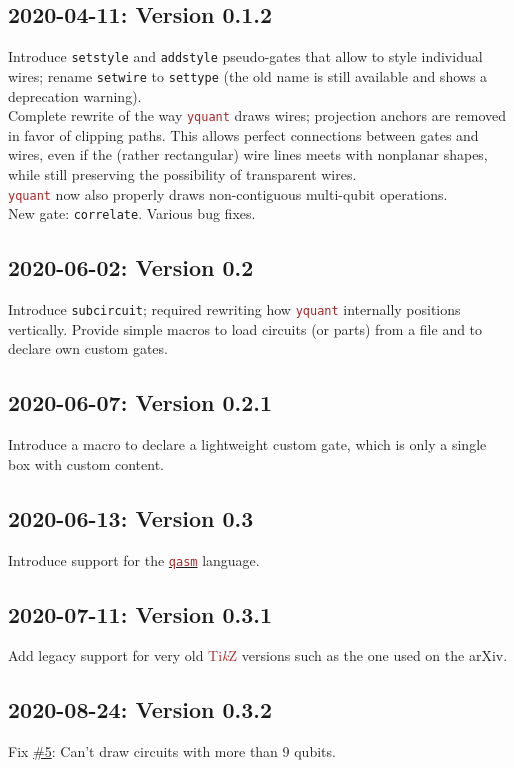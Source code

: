 \documentclass{scrartcl}
\def\TikZ{\textcolor{brown}{Ti\textit kZ}}
\def\pkg#1{\textcolor{brown}{\texttt{#1}}}
\def\langlink#1{\hyperref[sec:foreign:#1]{\pkg{#1}}}
\def\ttlink{\link\texttt}
\def\Yquant{\pkg{yquant}}
\begin{document}
      \subsection*{2020-04-11: Version 0.1.2}
         Introduce \ttlink{setstyle} and \ttlink{addstyle} pseudo\hyp gates that allow to style individual wires; rename \ttlink{setwire} to \ttlink{settype} (the old name is still available and shows a deprecation warning). \\
         Complete rewrite of the way \Yquant{} draws wires; projection anchors are removed in favor of clipping paths.
         This allows perfect connections between gates and wires, even if the (rather rectangular) wire lines meets with nonplanar shapes, while still preserving the possibility of transparent wires. \\
         \Yquant{} now also properly draws non\hyp contiguous multi\hyp qubit operations. \\
         New gate: \ttlink{correlate}.
         Various bug fixes.

      \subsection*{2020-06-02: Version 0.2}
         Introduce \ttlink{subcircuit}; required rewriting how \Yquant{} internally positions vertically.
         Provide simple macros to load circuits (or parts) from a file and to declare own custom gates.

      \subsection*{2020-06-07: Version 0.2.1}
         Introduce a macro to declare a lightweight custom gate, which is only a single box with custom content.

      \subsection*{2020-06-13: Version 0.3}
         Introduce support for the \langlink{qasm} language.

      \subsection*{2020-07-11: Version 0.3.1}
         Add legacy support for very old \TikZ{} versions such as the one used on the arXiv.

      \subsection*{2020-08-24: Version 0.3.2}
         Fix \href{https://github.com/projekter/yquant/issues/5}{\#5}: Can't draw circuits with more than 9 qubits.
\end{document}
